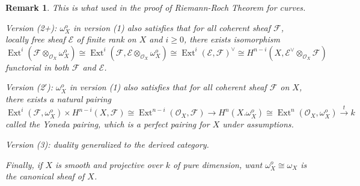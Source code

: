 \documentclass{ctexart}
\newtheorem{remark}{Remark}[section]
\newcommand{\ext}{\operatorname{Ext}}
\begin{document}
\begin{remark}
    This is what used in the proof of Riemann-Roch Theorem for curves.
    \par
    Version (2+): $\omega_{X}^{o}$ in version (1) also satisfies that for all coherent sheaf $\mathcal{F}$, locally free sheaf $\mathcal{E}$ of finite rank on $X$ and $i \ge 0$,
    there exists isomorphism 
    \begin{equation*}
        \ext^{i}(\mathcal{F} \otimes_{\mathcal{O}_{X}} \omega_{X}^{o}) \cong \ext^{i}(\mathcal{F}, \mathcal{E} \otimes_{\mathcal{O}_{X}} \omega_{X}^{o}) \cong \ext^{i}(\mathcal{E}, \mathcal{F})^{\lor} \cong H^{n - i}(X, \mathcal{E}^{\lor} \otimes_{\mathcal{O}_{X}} \mathcal{F})  
    \end{equation*}
    functorial in both $\mathcal{F}$ and $\mathcal{E}$.
    \par
    Version (2$'$): $\omega_{X}^{o}$ in version (1) also satisfies that for all coherent sheaf $\mathcal{F}$ on $X$,
    there exists a natural pairing 
    \begin{equation*}
        \ext^{i}(\mathcal{F}, \omega_{X}^{o}) \times H^{n - i}(X, \mathcal{F}) \cong \ext^{n - i}(\mathcal{O}_{X}, \mathcal{F}) \longrightarrow H^{n}(X. \omega_{X}^{o}) \cong \ext^{n}(\mathcal{O}_{X}, \omega_{X}^{o}) \overset{t}{\longrightarrow} k
    \end{equation*}
    called the Yoneda pairing, which is a perfect pairing for $X$ under assumptions.
    \par
    Version (3): duality generalized to the derived category.
    \par
    Finally, if $X$ is smooth and projective over $k$ of pure dimension, want $\omega_{X}^{o} \cong \omega_{X}$ is the canonical sheaf of $X$.
\end{remark}
\end{document}
